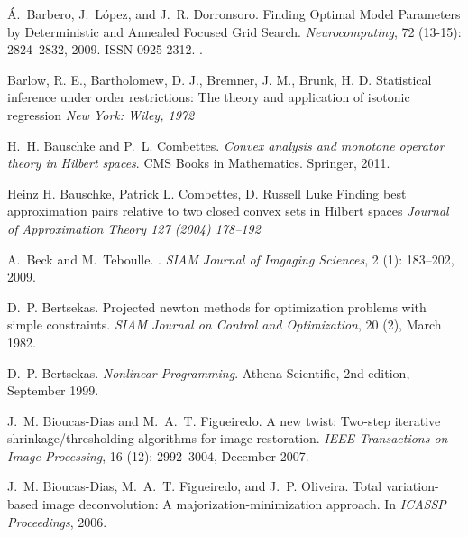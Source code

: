 \documentclass[twoside,11pt]{article}
\numberwithin{equation}{section}
\numberwithin{theorem}{section}
\begin{document}
\begin{thebibliography}{86}
{\'A}.~Barbero, J.~L{\'o}pez, and J.~R. Dorronsoro.
\newblock Finding {O}ptimal {M}odel {P}arameters by {D}eterministic and
  {A}nnealed {F}ocused {G}rid {S}earch.
\newblock \emph{Neurocomputing}, 72 (13-15): 2824--2832,
  2009.
\newblock ISSN 0925-2312.
\newblock {}.

Barlow, R. E., Bartholomew, D. J., Bremner, J. M., Brunk, H. D.
\newblock Statistical inference under order restrictions: The theory and application of isotonic regression
\newblock \emph{New York: Wiley, 1972}

H.~H. Bauschke and P.~L. Combettes.
\newblock \emph{Convex analysis and monotone operator theory in {H}ilbert
  spaces}.
\newblock CMS Books in Mathematics. Springer, 2011.

Heinz H. Bauschke, Patrick L. Combettes, D. Russell Luke
\newblock Finding best approximation pairs relative to two closed convex sets in Hilbert spaces
\newblock \emph{Journal of Approximation Theory 127 (2004) 178–192}


A.~Beck and M.~Teboulle.
.
\newblock \emph{SIAM Journal of Imgaging Sciences}, 2 (1):
  183--202, 2009.

D.~P. Bertsekas.
\newblock Projected newton methods for optimization problems with simple
  constraints.
\newblock \emph{SIAM Journal on Control and Optimization}, 20 (2),
  March 1982.

D.~P. Bertsekas.
\newblock \emph{Nonlinear Programming}.
\newblock Athena Scientific, 2nd edition, September 1999.

J.~M. Bioucas-Dias and M.~A.~T. Figueiredo.
\newblock A new twist: Two-step iterative shrinkage/thresholding algorithms for
  image restoration.
\newblock \emph{IEEE Transactions on Image Processing}, 16
  (12): 2992--3004, December 2007.

J.~M. Bioucas-Dias, M.~A.~T. Figueiredo, and J.~P. Oliveira.
\newblock Total variation-based image deconvolution: A
  majorization-minimization approach.
\newblock In \emph{ICASSP Proceedings}, 2006.


\end{thebibliography}
\end{document}
